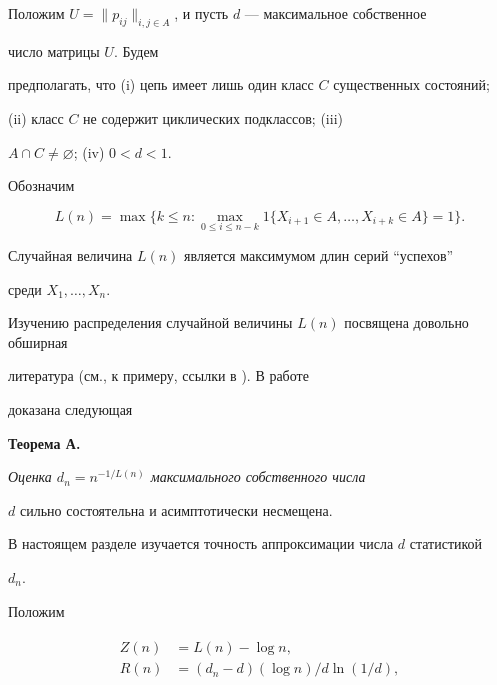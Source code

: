 


Положим $U=\|p_{ij}\|_{i,j\in A}$, и пусть $d$ --- максимальное собственное 


число матрицы $U$. Будем 


предполагать, что (i) цепь имеет лишь один класс $C$ существенных состояний; 


(ii) класс $C$ не содержит циклических подклассов; (iii) 


$A\cap C\ne\varnothing$; (iv) $0<d<1$. 


 


Обозначим 


$$ 


L(n)=\max\bigl\{k\le n:\max_{0\le i\le n-k}1\{X_{i+1}\in A,\dotsc, 


X_{i+k}\in A\}=1\bigr\}. 


$$ 


Случайная величина $L(n)$ является максимумом длин серий ``успехов'' 


среди $X_1,\dotsc,X_n$. 


 


Изучению распределения случайной величины $L(n)$ посвящена довольно обширная 


литература (см., к примеру, ссылки в \cite{Nov1}). В работе \cite{Nov2} 


доказана следующая 


 


\medskip 


{\bf Теорема А.} {\it Оценка $d_n=n^{-1/L(n)}$ максимального собственного числа 


$d$ сильно состоятельна и асимптотически несмещена.} 


\medskip 


 


В настоящем разделе изучается точность аппроксимации числа $d$ статистикой 


$d_n$. 


 


Положим 


\begin{align} 


\begin{split} 


Z(n) &=L(n)-\log n,\\ 


R(n) &=(d_n-d)(\log n)/d\ln (1/d), 


\end{split} 


\end{align} 


